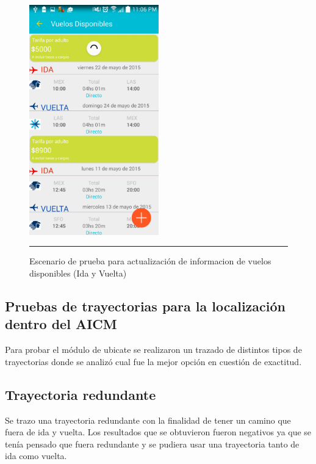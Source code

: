 \begin{figure}[h]
	\centering
		\includegraphics[width=0.5\textwidth]{Figuras/actualizaVueltas.png}
		\rule{30em}{0.5pt}
	\caption[Escenario de prueba para actualización de información de vuelos disponibles (Ida y Vuelta)]{Escenario de prueba para actualización de informacion de vuelos disponibles (Ida y Vuelta)}
	\label{fig:vistaPruebaActv}
\end{figure}
\clearpage

\subsection{Pruebas de trayectorias para la localización dentro del AICM}
Para probar el módulo de ubicate se realizaron un trazado de distintos tipos de trayectorias donde se analizó cual fue la mejor 
opción en cuestión de exactitud. 

\subsection{Trayectoria redundante}
Se trazo una trayectoria redundante con la finalidad de tener un camino que fuera de ida y vuelta. Los resultados que se obtuvieron 
fueron negativos ya que se tenía pensado que fuera redundante y se pudiera usar una trayectoria tanto de ida como vuelta.

